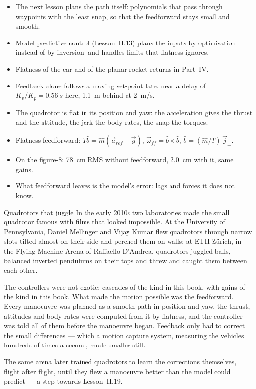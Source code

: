 \begin{lookahead}
\begin{itemize}[leftmargin=1.2em]
  \item The next lesson plans the path itself: polynomials that pass through waypoints with the least snap, so that the feedforward stays small and smooth.
  \item Model predictive control (Lesson~II.13) plans the inputs by optimisation instead of by inversion, and handles limits that flatness ignores.
  \item Flatness of the car and of the planar rocket returns in Part~IV.
\end{itemize}
\end{lookahead}

\begin{remember}
\begin{itemize}
  \item Feedback alone follows a moving set-point late: near a delay of $K_v/K_p = \SI{0.56}{s}$ here, \SI{1.1}{m} behind at \SI{2}{m/s}.
  \item The quadrotor is flat in its position and yaw: the acceleration gives the thrust and the attitude, the jerk the body rates, the snap the torques.
  \item Flatness feedforward: $T\hat b = \hat m(\vec a_{ref} - \vec g)$, $\vec\omega_{ff} = \hat b \times \dot{\hat b}$, $\dot{\hat b} = (\hat m/T)\,\vec j_\perp$.
  \item On the figure-8: \SI{78}{cm} RMS without feedforward, \SI{2.0}{cm} with it, same gains.
  \item What feedforward leaves is the model's error: lags and forces it does not know.
\end{itemize}
\end{remember}

\begin{curiosity}{Quadrotors that juggle}
In the early 2010s two laboratories made the small quadrotor famous with films that looked impossible. At the University of Pennsylvania, Daniel Mellinger and Vijay Kumar flew quadrotors through narrow slots tilted almost on their side and perched them on walls; at ETH Zürich, in the Flying Machine Arena of Raffaello D'Andrea, quadrotors juggled balls, balanced inverted pendulums on their tops and threw and caught them between each other.

The controllers were not exotic: cascades of the kind in this book, with gains of the kind in this book. What made the motion possible was the feedforward. Every manoeuvre was planned as a smooth path in position and yaw, the thrust, attitudes and body rates were computed from it by flatness, and the controller was told all of them before the manoeuvre began. Feedback only had to correct the small differences — which a motion capture system, measuring the vehicles hundreds of times a second, made smaller still.

The same arena later trained quadrotors to learn the corrections themselves, flight after flight, until they flew a manoeuvre better than the model could predict — a step towards Lesson~II.19.
\end{curiosity}

